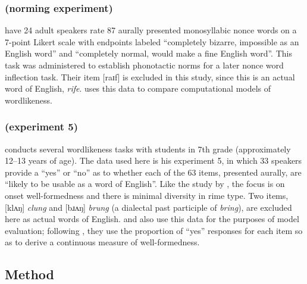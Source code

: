 \subsubsection{\citealt{Albright2003b} (norming experiment)}

\citet{Albright2003b} have 24 adult speakers rate 87 aurally presented monosyllabic nonce words on a 7-point Likert scale with endpoints labeled ``completely bizarre, impossible as an English word'' and ``completely normal, would make a fine English word''. This task was administered to establish phonotactic norms for a later nonce word inflection task. Their item [raɪf] is excluded in this study, since this is an actual word of English, \emph{rife}. \citet{Albright2009a} uses this data to compare computational models of wordlikeness.

\subsubsection{\citealt{Scholes1966} (experiment 5)}

\citet{Scholes1966} conducts several wordlikeness tasks with 
students in 7th grade (approximately 12--13 years of age).
The data used here is his experiment 5, in which 33 speakers provide a ``yes'' or ``no'' as to whether each of the 63 items, presented aurally, are ``likely to be usable as a word of English''. 
Like the study by \citet{Albright2007}, the focus is on onset well-formedness and there is minimal diversity in rime type. 
Two items, [klʌŋ] \emph{clung} and [bɹʌŋ] \emph{brung} (a dialectal past participle of \emph{bring}), are excluded here as actual words of English. 
\citet{Albright2009a} and \citet{Hayes2008a} also use this data for the purposes of model evaluation; following \citet{Frisch2000}, they use the proportion of ``yes'' responses for each item so as to derive a continuous measure of well-formedness.

\subsection{Method}

